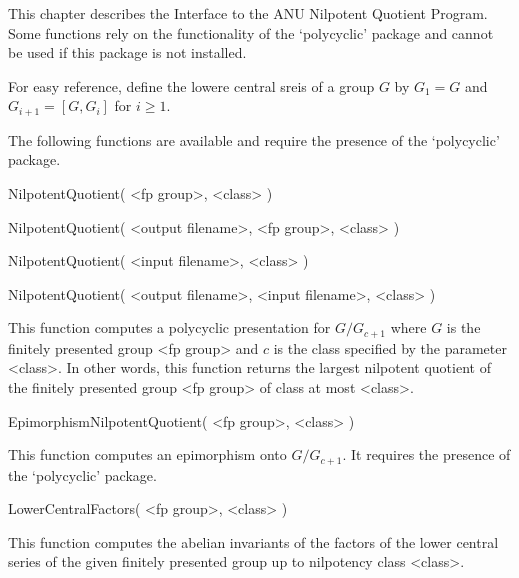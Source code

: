 

This chapter describes the Interface to the ANU Nilpotent Quotient
Program.  Some functions rely on the functionality of the `polycyclic'
package and cannot be used if this package is not installed.

For easy reference, define the lowere central sreis of a group $G$ by
$G_1 = G$ and $G_{i+1} = [G,G_i]$ for $i \geq 1.$


The following functions are available and require the presence of the
`polycyclic' package.

\>NilpotentQuotient( <fp group>, <class> )

\>NilpotentQuotient( <output filename>, <fp group>, <class> )

\>NilpotentQuotient( <input filename>, <class> )

\>NilpotentQuotient( <output filename>, <input filename>, <class> )

This function computes a polycyclic presentation for $G/G_{c+1}$ where
$G$ is  the finitely presented group  <fp group> and $c$  is the class
specified  by the parameter  <class>.  In  other words,  this function
returns the largest nilpotent quotient of the finitely presented group
<fp group> of class at most <class>.

\>EpimorphismNilpotentQuotient( <fp group>, <class> )

This function computes an epimorphism onto $G/G_{c+1}.$  It requires the
presence of the `polycyclic' package.

\>LowerCentralFactors( <fp group>, <class> )

This function computes the abelian invariants of the factors of the lower
central series of the given finitely presented group up to nilpotency
class <class>.



